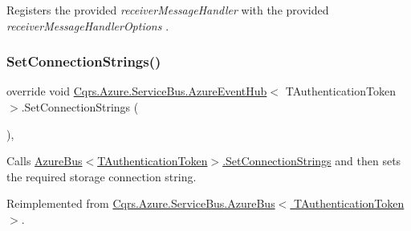 Registers the provided {\itshape receiver\+Message\+Handler}  with the provided {\itshape receiver\+Message\+Handler\+Options} . 

\mbox{\label{classCqrs_1_1Azure_1_1ServiceBus_1_1AzureEventHub_af823e573f3acc3fa9949969499309db1_af823e573f3acc3fa9949969499309db1}} 
\subsubsection{\texorpdfstring{Set\+Connection\+Strings()}{SetConnectionStrings()}}
{\footnotesize\ttfamily override void \hyperlink{classCqrs_1_1Azure_1_1ServiceBus_1_1AzureEventHub}{Cqrs.\+Azure.\+Service\+Bus.\+Azure\+Event\+Hub}$<$ T\+Authentication\+Token $>$.Set\+Connection\+Strings (\begin{DoxyParamCaption}{ }\end{DoxyParamCaption})\hspace{0.3cm}{\ttfamily [protected]}, {\ttfamily [virtual]}}



Calls \hyperlink{classCqrs_1_1Azure_1_1ServiceBus_1_1AzureBus_a8a1be9145b0a92c0037ef1b8b4cc79d9_a8a1be9145b0a92c0037ef1b8b4cc79d9}{Azure\+Bus$<$\+T\+Authentication\+Token$>$.\+Set\+Connection\+Strings} and then sets the required storage connection string. 



Reimplemented from \hyperlink{classCqrs_1_1Azure_1_1ServiceBus_1_1AzureBus_a8a1be9145b0a92c0037ef1b8b4cc79d9_a8a1be9145b0a92c0037ef1b8b4cc79d9}{Cqrs.\+Azure.\+Service\+Bus.\+Azure\+Bus$<$ T\+Authentication\+Token $>$}.

\mbox{\label{classCqrs_1_1Azure_1_1ServiceBus_1_1AzureEventHub_a5924517b1e88c09e3c0c1aec9c737a8d_a5924517b1e88c09e3c0c1aec9c737a8d}} 
